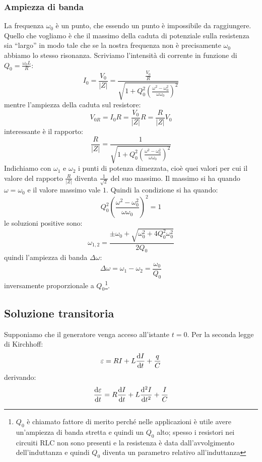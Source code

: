 \subsubsection{Ampiezza di banda}
La frequenza $\omega_0$ è un punto, che essendo un punto è impossibile da raggiungere. Quello che vogliamo è che il massimo della caduta di potenziale sulla resistenza sia ``largo'' in modo tale che se la nostra frequenza non è precisamente $\omega_0$ abbiamo lo stesso risonanza. Scriviamo l'intensità di corrente in funzione di $Q_0=\frac{\omega_0L}{R}$:
\begin{equation}
  I_0=\frac{V_0}{|Z|}=\frac{\frac{V_0}{R}}{\sqrt{1+Q_0^2\left(\frac{\omega^2-\omega_0^2}{\omega\omega_0}\right)^2}}
\end{equation}
mentre l'ampiezza della caduta sul resistore:
\begin{equation}
  V_{0R}=I_0R=\frac{V_0}{|Z|}R=\frac{R}{|Z|}V_0
\end{equation}
interessante è il rapporto:
\begin{equation}
  \frac{R}{|Z|}=\frac{1}{\sqrt{1+Q_0^2\left(\frac{\omega^2-\omega_0^2}{\omega\omega_0}\right)^2}}
\end{equation}
Indichiamo con $\omega_1$ e $\omega_2$ i punti di potenza dimezzata, cioè quei valori per cui il valore del rapporto $\frac{R}{|Z|}$ diventa $\frac{1}{\sqrt{2}}$ del suo massimo. Il massimo si ha quando $\omega=\omega_0$ e il valore massimo vale $1$. Quindi la condizione si ha quando:
\begin{equation}
  Q_0^2\left(\frac{\omega^2-\omega_0^2}{\omega\omega_0}\right)^2=1
\end{equation}
le soluzioni positive sono:
\begin{equation}
  \omega_{1,2}=\frac{\pm\omega_0+\sqrt{\omega_0^2+4Q_0^2\omega_0^2}}{2Q_0}
\end{equation}
quindi l'ampiezza di banda $\Delta\omega$:
\begin{equation}
  \Delta\omega=\omega_1-\omega_2=\frac{\omega_0}{Q_0}
\end{equation}
inversamente proporzionale a $Q_0$\footnote{$Q_0$ è chiamato fattore di merito perché nelle applicazioni è utile avere un'ampiezza di banda stretta e quindi un $Q_0$ alto; spesso i resistori nei circuiti RLC non sono presenti e la resistenza è data dall'avvolgimento dell'induttanza e quindi $Q_0$ diventa un parametro relativo all'induttanza}.

\subsection{Soluzione transitoria}
Supponiamo che il generatore venga acceso all'istante $t=0$. Per la seconda legge di Kirchhoff:
\begin{equation}
  \varepsilon=RI+L\frac{\mathrm{d} I}{\mathrm{d} t}+\frac{q}{C}
\end{equation}
derivando:
\begin{equation}
  \frac{\mathrm{d} \varepsilon}{\mathrm{d} t}=R\frac{\mathrm{d} I}{\mathrm{d} t}+L\frac{\mathrm{d}^2 I}{\mathrm{d} t^2}+\frac{I}{C}
\end{equation}


